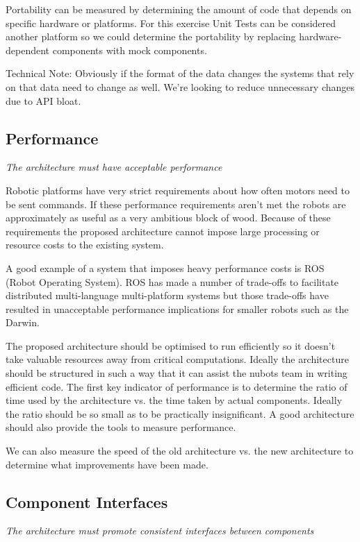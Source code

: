 \documentclass[english,12pt]{scrartcl}
\newcommand{\requirement}[1]{\textit{#1}}
\begin{document}
			Portability can be measured by determining the amount of code that depends on specific
			hardware or platforms. For this exercise Unit Tests can be considered another platform
			so we could determine the portability by replacing hardware-dependent components with
			mock components.

			Technical Note: Obviously if the format of the data changes the systems that rely on
			that data need to change as well. We're looking to reduce unnecessary changes due to API
			bloat.

		\subsection{Performance}
			\requirement{The architecture must have acceptable performance}

			Robotic platforms have very strict requirements about how often motors need to be sent
			commands. If these performance requirements aren't met the robots are approximately as
			useful as a very ambitious block of wood. Because of these requirements the proposed
			architecture cannot impose large processing or resource costs to the existing system.

			A good example of a system that imposes heavy performance costs is ROS (Robot Operating
			System). ROS has made a number of trade-offs to facilitate distributed multi-language
			multi-platform systems but those trade-offs have resulted in unacceptable performance
			implications for smaller robots such as the Darwin.

			The proposed architecture should be optimised to run efficiently so it doesn't take
			valuable resources away from critical computations. Ideally the architecture should be
			structured in such a way that it can assist the \gls{nubots} team in writing efficient code.
			The first key indicator of performance is to determine the ratio of time used by the
			architecture vs. the time taken by actual components. Ideally the ratio should be so
			small as to be practically insignificant. A good architecture should also provide the
			tools to measure performance.

			We can also measure the speed of the old architecture vs. the new architecture to
			determine what improvements have been made.

		\subsection{Component Interfaces}
			\requirement{The architecture must promote consistent interfaces between components}
\end{document}
